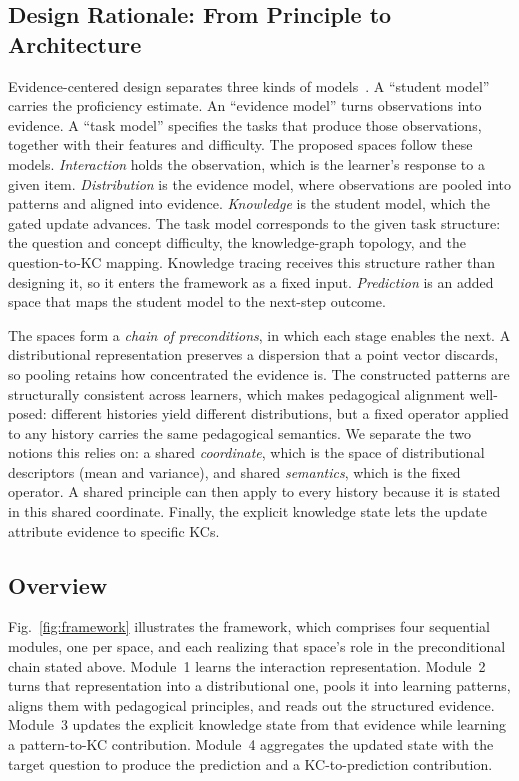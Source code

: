 \documentclass[conference]{IEEEtran}
\begin{document}
\subsection{Design Rationale: From Principle to Architecture}
\label{sec:rationale}

Evidence-centered design separates three kinds of models~\cite{mislevy2005ecd}. A ``student model'' carries the proficiency estimate. An ``evidence model'' turns observations into evidence. A ``task model'' specifies the tasks that produce those observations, together with their features and difficulty. The proposed spaces follow these models. \emph{Interaction} holds the observation, which is the learner's response to a given item. \emph{Distribution} is the evidence model, where observations are pooled into patterns and aligned into evidence. \emph{Knowledge} is the student model, which the gated update advances. The task model corresponds to the given task structure: the question and concept difficulty, the knowledge-graph topology, and the question-to-KC mapping. Knowledge tracing receives this structure rather than designing it, so it enters the framework as a fixed input. \emph{Prediction} is an added space that maps the student model to the next-step outcome.

The spaces form a \emph{chain of preconditions}, in which each stage enables the next. A distributional representation preserves a dispersion that a point vector discards, so pooling retains how concentrated the evidence is. The constructed patterns are structurally consistent across learners, which makes pedagogical alignment well-posed: different histories yield different distributions, but a fixed operator applied to any history carries the same pedagogical semantics. We separate the two notions this relies on: a shared \emph{coordinate}, which is the space of distributional descriptors (mean and variance), and shared \emph{semantics}, which is the fixed operator. A shared principle can then apply to every history because it is stated in this shared coordinate. Finally, the explicit knowledge state lets the update attribute evidence to specific KCs.

\subsection{Overview}

Fig.~\ref{fig:framework} illustrates the framework, which comprises four sequential modules, one per space, and each realizing that space's role in the preconditional chain stated above. Module~1 learns the interaction representation. Module~2 turns that representation into a distributional one, pools it into learning patterns, aligns them with pedagogical principles, and reads out the structured evidence. Module~3 updates the explicit knowledge state from that evidence while learning a pattern-to-KC contribution. Module~4 aggregates the updated state with the target question to produce the prediction and a KC-to-prediction contribution.
\end{document}

